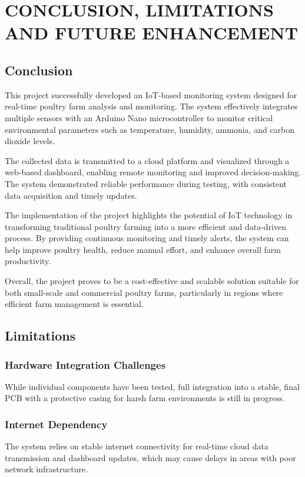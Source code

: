 \documentclass[../main.tex]{subfiles}
\begin{document}
\section{CONCLUSION, LIMITATIONS AND FUTURE ENHANCEMENT}
\subsection{Conclusion}

This project successfully developed an IoT-based monitoring system designed for real-time poultry farm analysis and monitoring. The system effectively integrates multiple sensors with an Arduino Nano microcontroller to monitor critical environmental parameters such as temperature, humidity, ammonia, and carbon dioxide levels.


The collected data is transmitted to a cloud platform and visualized through a web-based dashboard, enabling remote monitoring and improved decision-making. The system demonstrated reliable performance during testing, with consistent data acquisition and timely updates.


The implementation of the project highlights the potential of IoT technology in transforming traditional poultry farming into a more efficient and data-driven process. By providing continuous monitoring and timely alerts, the system can help improve poultry health, reduce manual effort, and enhance overall farm productivity.


Overall, the project proves to be a cost-effective and scalable solution suitable for both small-scale and commercial poultry farms, particularly in regions where efficient farm management is essential.


\subsection{Limitations}
\subsubsection{Hardware Integration Challenges}
While individual components have been tested, full integration into a stable, final PCB with a protective casing for harsh farm environments is still in progress.

\subsubsection{Internet Dependency}
The system relies on stable internet connectivity for real-time cloud data transmission and dashboard updates, which may cause delays in areas with poor network infrastructure.
\end{document}
